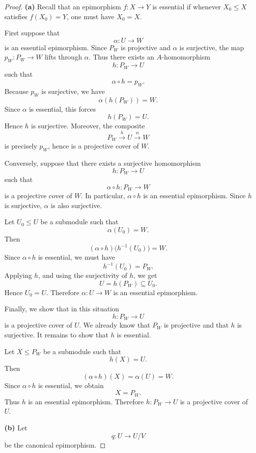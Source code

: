     \begin{proof}
    \textbf{(a)}
    Recall that an epimorphism \(f:X\to Y\) is essential if whenever \(X_0\leq X\) satisfies
    \(f(X_0)=Y\), one must have \(X_0=X\).
    
    First suppose that
    \[
    \alpha:U\longrightarrow W
    \]
    is an essential epimorphism. Since \(P_W\) is projective and \(\alpha\) is surjective,
    the map \(p_W:P_W\to W\) lifts through \(\alpha\). Thus there exists an \(A\)-homomorphism
    \[
    h:P_W\longrightarrow U
    \]
    such that
    \[
    \alpha\circ h=p_W.
    \]
    Because \(p_W\) is surjective, we have
    \[
    \alpha(h(P_W))=W.
    \]
    Since \(\alpha\) is essential, this forces
    \[
    h(P_W)=U.
    \]
    Hence \(h\) is surjective. Moreover, the composite
    \[
    P_W \xrightarrow{\,h\,} U \xrightarrow{\,\alpha\,} W
    \]
    is precisely \(p_W\), hence is a projective cover of \(W\).
    
    Conversely, suppose that there exists a surjective homomorphism
    \[
    h:P_W\longrightarrow U
    \]
    such that
    \[
    \alpha\circ h:P_W\longrightarrow W
    \]
    is a projective cover of \(W\). In particular, \(\alpha\circ h\) is an essential epimorphism.
    Since \(h\) is surjective, \(\alpha\) is also surjective.
    
    Let \(U_0\leq U\) be a submodule such that
    \[
    \alpha(U_0)=W.
    \]
    Then
    \[
    (\alpha\circ h)\bigl(h^{-1}(U_0)\bigr)=W.
    \]
    Since \(\alpha\circ h\) is essential, we must have
    \[
    h^{-1}(U_0)=P_W.
    \]
    Applying \(h\), and using the surjectivity of \(h\), we get
    \[
    U=h(P_W)\subseteq U_0.
    \]
    Hence \(U_0=U\). Therefore \(\alpha:U\to W\) is an essential epimorphism.
    
    Finally, we show that in this situation
    \[
    h:P_W\longrightarrow U
    \]
    is a projective cover of \(U\). We already know that \(P_W\) is projective and that \(h\)
    is surjective. It remains to show that \(h\) is essential.
    
    Let \(X\leq P_W\) be a submodule such that
    \[
    h(X)=U.
    \]
    Then
    \[
    (\alpha\circ h)(X)=\alpha(U)=W.
    \]
    Since \(\alpha\circ h\) is essential, we obtain
    \[
    X=P_W.
    \]
    Thus \(h\) is an essential epimorphism. Therefore \(h:P_W\to U\) is a projective cover
    of \(U\).
    
    \medskip
    
    \textbf{(b)}
    Let
    \[
    q:U\longrightarrow U/V
    \]
    be the canonical epimorphism.
    

\end{proof}
